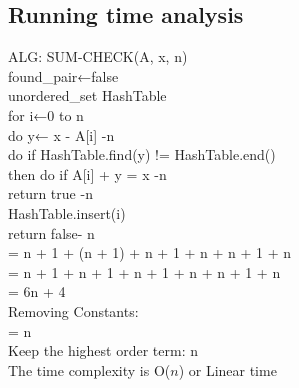 \documentclass[12pt]{article}
\begin{document}
	\subsection{Running time analysis}
	ALG: SUM-CHECK(A, x, n) \\
	\indent \indent found\_pair←false \indent \indent \indent \indent \indent \indent \indent \indent \indent \indent \indent \indent {}\\
	\indent \indent unordered\_set HashTable\indent \indent \indent \indent \indent \indent \indent \indent \indent \indent {}  \\
	\indent \indent \indent for i←0 to n \indent \indent \indent \indent \indent \indent \indent \indent \indent \indent \indent \indent \space \space {}  \\
	\indent \indent \indent \indent do y← x - A[i] \indent \indent \indent \indent \indent \indent \indent \indent \indent \indent  \indent-n \\
	\indent \indent \indent \indent do if HashTable.find(y)  != HashTable.end() \indent \indent \space {}\\
	\indent \indent \indent \indent \indent \indent then do if A[i] + y = x \indent \indent \indent \indent \indent \indent \space \space-n\\
	\indent \indent \indent \indent \indent \indent \indent return true \indent \indent \indent \indent \indent \indent \indent \indent \indent -n \\
	\indent \indent \indent HashTable.insert(i) \indent \indent \indent \indent \indent \indent \indent \indent \indent \indent \space \space{}\\
	\indent \indent return false\indent \indent \indent \indent \indent \indent \indent \indent \indent \indent \indent \indent \indent \indent - n \\
	= n + 1 + (n + 1) + n + 1 + n + n  + 1 + n   \\
	= n + 1 + n + 1 + n + 1 + n + n + 1 + n\\
	= 6n + 4\\
	Removing Constants: \\
	= n \\
	Keep the highest order term: n \\
	The time complexity is O($ n $) or Linear time \\
\end{document}
